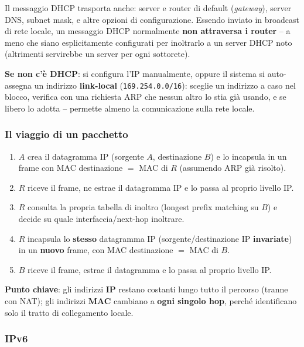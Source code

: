 \documentclass[12pt, a4paper]{article}
\begin{document}
Il messaggio DHCP trasporta anche: server e router di default (\textit{gateway}), server DNS, subnet mask, e altre opzioni di configurazione. Essendo inviato in broadcast di rete locale, un messaggio DHCP normalmente \textbf{non attraversa i router} -- a meno che siano esplicitamente configurati per inoltrarlo a un server DHCP noto (altrimenti servirebbe un server per ogni sottorete).

\textbf{Se non c'è DHCP}: si configura l'IP manualmente, oppure il sistema si auto-assegna un indirizzo \textbf{link-local} (\texttt{169.254.0.0/16}): sceglie un indirizzo a caso nel blocco, verifica con una richiesta ARP che nessun altro lo stia già usando, e se libero lo adotta -- permette almeno la comunicazione sulla rete locale.

\subsubsection{Il viaggio di un pacchetto}

\begin{tcolorbox}[colback=lightergray!10, colframe=tocsec, title=\textbf{Riepilogo end-to-end: A $\to$ R $\to$ B}]
\begin{enumerate}
    \item $A$ crea il datagramma IP (sorgente $A$, destinazione $B$) e lo incapsula in un frame con MAC destinazione $=$ MAC di $R$ (assumendo ARP già risolto).
    \item $R$ riceve il frame, ne estrae il datagramma IP e lo passa al proprio livello IP.
    \item $R$ consulta la propria tabella di inoltro (longest prefix matching su $B$) e decide su quale interfaccia/next-hop inoltrare.
    \item $R$ incapsula lo \textbf{stesso} datagramma IP (sorgente/destinazione IP \textbf{invariate}) in un \textbf{nuovo} frame, con MAC destinazione $=$ MAC di $B$.
    \item $B$ riceve il frame, estrae il datagramma e lo passa al proprio livello IP.
\end{enumerate}
\textbf{Punto chiave}: gli indirizzi \textbf{IP} restano costanti lungo tutto il percorso (tranne con NAT); gli indirizzi \textbf{MAC} cambiano a \textbf{ogni singolo hop}, perché identificano solo il tratto di collegamento locale.
\end{tcolorbox}

\subsubsection{IPv6}
\end{document}
